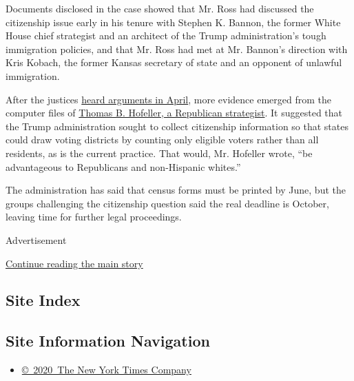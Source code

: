 Documents disclosed in the case showed that Mr. Ross had discussed the
citizenship issue early in his tenure with Stephen K. Bannon, the former
White House chief strategist and an architect of the Trump
administration's tough immigration policies, and that Mr. Ross had met
at Mr. Bannon's direction with Kris Kobach, the former Kansas secretary
of state and an opponent of unlawful immigration.

After the justices
\href{https://www.nytimes.com/2019/04/23/us/politics/supreme-court-census-citizenship.html}{heard
arguments in April}, more evidence emerged from the computer files of
\href{https://www.nytimes.com/2018/08/21/obituaries/thomas-hofeller-republican-master-of-political-maps-dies-at-75.html}{Thomas
B. Hofeller, a Republican strategist}. It suggested that the Trump
administration sought to collect citizenship information so that states
could draw voting districts by counting only eligible voters rather than
all residents, as is the current practice. That would, Mr. Hofeller
wrote, ``be advantageous to Republicans and non-Hispanic whites.''

The administration has said that census forms must be printed by June,
but the groups challenging the citizenship question said the real
deadline is October, leaving time for further legal proceedings.

Advertisement

\protect\hyperlink{after-bottom}{Continue reading the main story}

\hypertarget{site-index}{%
\subsection{Site Index}\label{site-index}}

\hypertarget{site-information-navigation}{%
\subsection{Site Information
Navigation}\label{site-information-navigation}}

\begin{itemize}
\tightlist
\item
  \href{https://help.nytimes.com/hc/en-us/articles/115014792127-Copyright-notice}{©~2020~The
  New York Times Company}
\end{itemize}

